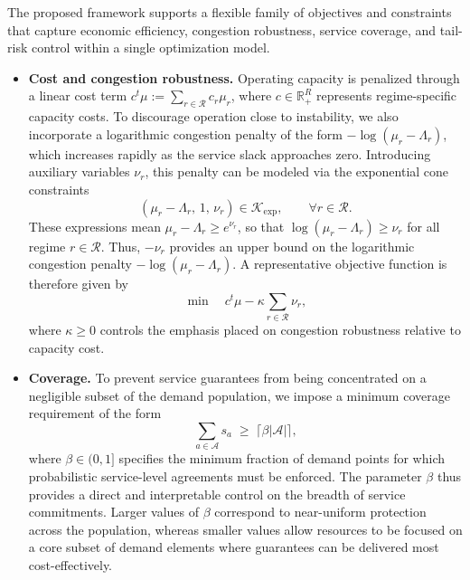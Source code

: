 \documentclass[letter,11pt, reqno]{amsart}
\def\RR{\mathcal{R}}
\begin{document}
\noindent The proposed framework supports a flexible family of objectives and constraints
that capture economic efficiency, congestion robustness, service coverage, and
tail-risk control within a single optimization model.
\begin{itemize}

\item[-] \textbf{Cost and congestion robustness.}
Operating capacity is penalized through a linear cost term $c^t \mu:=\sum_{r\in\mathcal{R}} c_r \mu_r$, where
$c\in\mathbb{R}^{R}_+$ represents regime-specific capacity costs. To
discourage operation close to instability, we also incorporate a logarithmic
congestion penalty of the form $-\log(\mu_r-\Lambda_r)$, which increases rapidly
as the service slack approaches zero. Introducing auxiliary variables $\nu_r$, this penalty can be modeled via the exponential cone constraints
\begin{equation}
(\mu_r-\Lambda_r,\,1,\,\nu_r)\in\mathcal{K}_{\exp},
\qquad \forall r\in\mathcal{R}.
\label{eq:exp_log}
\end{equation}
These expressions mean $\mu_r-\Lambda_r\ge e^{\nu_r}$, so that $\log(\mu_r-\Lambda_r)\ge \nu_r$ for all regime $r\in\RR$. Thus, $-\nu_r$ provides an upper bound on the logarithmic
congestion penalty $-\log(\mu_r-\Lambda_r)$. A
representative objective function is therefore given by
\begin{equation}
\min \quad c^{t}\mu - \kappa \sum_{r\in\mathcal{R}} \nu_r,
\label{eq:obj_tradeoff}
\end{equation}
where $\kappa\ge 0$ controls the emphasis placed on congestion robustness relative
to capacity cost.

\item[-] \textbf{Coverage.}
To prevent service guarantees from being concentrated on a negligible subset of
the demand population, we impose a minimum coverage requirement of the form
\begin{equation}
\sum_{a\in\mathcal{A}} s_a \;\ge\; \lceil \beta |\mathcal{A}| \rceil,
\label{eq:coverage}
\end{equation}
where $\beta\in(0,1]$ specifies the minimum fraction of demand points for which
probabilistic service-level agreements must be enforced. The parameter $\beta$
thus provides a direct and interpretable control on the breadth of service
commitments. Larger values of $\beta$ correspond to near-uniform protection
across the population, whereas smaller values allow resources to be focused on a
core subset of demand elements where guarantees can be delivered most
cost-effectively.




\end{itemize}
\end{document}
